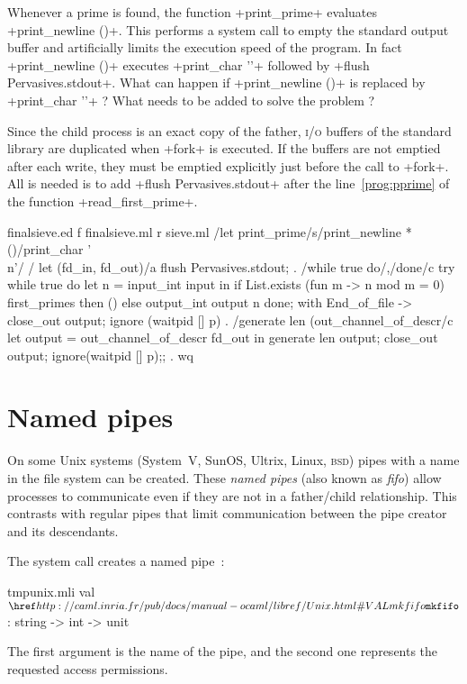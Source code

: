 \begin{exercise}
Whenever a prime is found, the function \ml+print_prime+ evaluates
\ml+print_newline ()+. This performs a system call to empty the standard
output buffer and artificially limits the execution speed of the program.
In fact \ml+print_newline ()+ executes \ml+print_char '\n'+
followed by \ml+flush Pervasives.stdout+. What can happen if
\ml+print_newline ()+ is replaced by \ml+print_char '\n'+ ? What needs
to be added to solve the problem ?
\end{exercise}
\begin{answer}
Since the child process is an exact copy of the father, \textsc{i/o}
buffers of the standard library are duplicated when \ml+fork+ is
executed. If the buffers are not emptied after each write,
they must be emptied explicitly just before the call to
\ml+fork+. All is needed is to add 
\ml+flush Pervasives.stdout+ after the line~\ref{prog:pprime} of the 
function \ml+read_first_prime+.
\end{answer}
%
\begin{codefile}{finalsieve.ed}
f finalsieve.ml
r sieve.ml
/let print_prime/s/print_newline *()/print_char '\\n'/
/    let (fd_in, fd_out)/a
    flush Pervasives.stdout;
.
/while true do/,/done/c
        try 
          while true do
            let n = input_int input in
            if List.exists (fun m -> n mod m = 0) first_primes then ()
            else output_int output n
          done;
        with End_of_file -> 
          close_out output;
          ignore (waitpid [] p)
.
/generate len (out_channel_of_descr/c
      let output = out_channel_of_descr fd_out in
      generate len output;
      close_out output;
      ignore(waitpid [] p);;
.
wq
\end{codefile}

\section{Named pipes}

On some Unix systems (System~V, SunOS, Ultrix, Linux, \textsc{bsd})
pipes with a name in the file system can be created. These \emph{named
  pipes} (also known as \emph{fifo}) allow processes to communicate
even if they are not in a father/child relationship. This contrasts
with regular pipes that limit communication between the pipe creator
and its descendants.

The system call  creates a named pipe~: 
%
\begin{listingcodefile}{tmpunix.mli}
val $\indexlibvalue{Unix}{mkfifo}$ : string -> int -> unit
\end{listingcodefile}
%
The first argument is the name of the pipe, and the second one represents the
requested access permissions.

